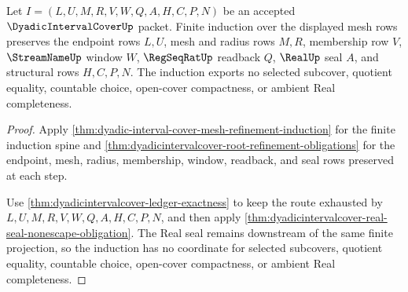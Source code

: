 \begin{theorem}
\label{thm:dyadic-interval-cover-finite-mesh-induction}
Let $I=(L,U,M,R,V,W,Q,A,H,C,P,N)$ be an accepted $\DyadicIntervalCoverUp$ packet. Finite induction over the displayed mesh rows preserves the endpoint rows $L,U$, mesh and radius rows $M,R$, membership row $V$, $\StreamNameUp$ window $W$, $\RegSeqRatUp$ readback $Q$, $\RealUp$ seal $A$, and structural rows $H,C,P,N$. The induction exports no selected subcover, quotient equality, countable choice, open-cover compactness, or ambient Real completeness.
\end{theorem}
\begin{proof}
Apply \autoref{thm:dyadic-interval-cover-mesh-refinement-induction} for the finite induction spine and \autoref{thm:dyadicintervalcover-root-refinement-obligations} for the endpoint, mesh, radius, membership, window, readback, and seal rows preserved at each step.

Use \autoref{thm:dyadicintervalcover-ledger-exactness} to keep the route exhausted by $L,U,M,R,V,W,Q,A,H,C,P,N$, and then apply \autoref{thm:dyadicintervalcover-real-seal-nonescape-obligation}. The Real seal remains downstream of the same finite projection, so the induction has no coordinate for selected subcovers, quotient equality, countable choice, open-cover compactness, or ambient Real completeness.
\end{proof}

